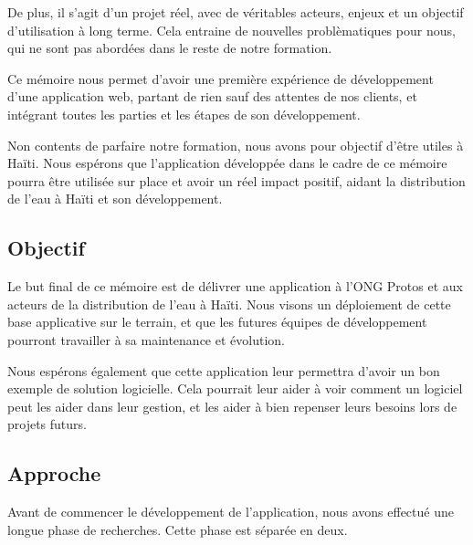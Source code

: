 \documentclass{eplmastersthesis_FR}
\begin{document}
			De plus, il s'agit d'un projet réel, avec de véritables acteurs, enjeux et un objectif d'utilisation à long terme. Cela entraine de nouvelles problèmatiques pour nous, qui ne sont pas abordées dans le reste de notre formation.

			Ce mémoire nous permet d'avoir une première expérience de développement d'une application web, partant de rien sauf des attentes de nos clients, et intégrant toutes les parties et les étapes de son développement.

			Non contents de parfaire notre formation, nous avons pour objectif d'être utiles à Haïti. Nous espérons que l'application développée dans le cadre de ce mémoire pourra être utilisée sur place et avoir un réel impact positif, aidant la distribution de l'eau à Haïti et son développement.

		\subsection*{Objectif}

			Le but final de ce mémoire est de délivrer une application à l'ONG Protos et aux acteurs de la distribution de l'eau à Haïti. Nous visons un déploiement de cette base applicative sur le terrain, et que les futures équipes de développement pourront travailler à sa maintenance et évolution.

			Nous espérons également que cette application leur permettra d'avoir un bon exemple de solution logicielle. Cela pourrait leur aider à voir comment un logiciel peut les aider dans leur gestion, et les aider à bien repenser leurs besoins lors de projets futurs.

		\subsection*{Approche}

			Avant de commencer le développement de l'application, nous avons effectué une longue phase de recherches. Cette phase est séparée en deux.
\end{document}
